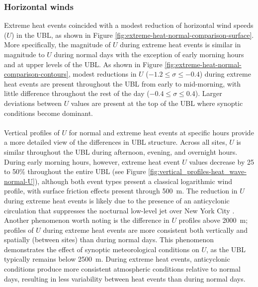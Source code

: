 \documentclass[11pt,a4paper]{article}
\begin{document}
\subsubsection{Horizontal winds}
Extreme heat events coincided with a modest reduction of horizontal wind speeds ($U$) in the UBL, as shown in Figure \ref{fig:extreme-heat-normal-comparison-surface}. More specifically, the magnitude of $U$ during extreme heat events is similar in magnitude to $U$ during normal days with the exception of early morning hours and at upper levels of the UBL. As shown in Figure \ref{fig:extreme-heat-normal-comparison-contours}, modest reductions in $U$ ($-1.2 \leq \sigma \leq -0.4$) during extreme heat events are present throughout the UBL from early to mid-morning, with little difference throughout the rest of the day ($-0.4 \leq \sigma \leq 0.4$). Larger deviations between $U$ values are present at the top of the UBL where synoptic conditions become dominant.
\\ \\
Vertical profiles of $U$ for normal and extreme heat events at specific hours provide a more detailed view of the differences in UBL structure. Across all sites, $U$ is similar throughout the UBL during afternoon, evening, and overnight hours. During early morning hours, however, extreme heat event $U$ values decrease by 25 to 50\% throughout the entire UBL (see Figure \ref{fig:vertical_profiles-heat_wave-normal-U}), although both event types present a classical logarithmic wind profile, with surface friction effects present through \SI{500}{\meter}. The reduction in $U$ during extreme heat events is likely due to the presence of an anticyclonic circulation that suppresses the nocturnal low-level jet over New York City \citep{chen1993}. Another phenomenon worth noting is the difference in $U$ profiles above \SI{2000}{\meter}; profiles of $U$ during extreme heat events are more consistent both vertically and spatially (between sites) than during normal days. This phenomenon demonstrates the effect of synoptic meteorological conditions on $U$, as the UBL typically remains below \SI{2500}{\meter}. During extreme heat events, anticyclonic conditions produce more consistent atmospheric conditions relative to normal days, resulting in less variability between heat events than during normal days.
\\ \\
\end{document}
